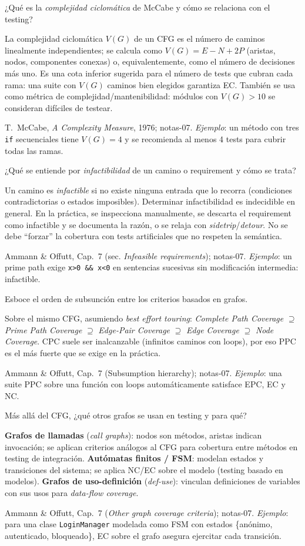 \documentclass[11pt,a4paper]{article}
\newcounter{preg}
\newcommand{\qa}[3]{%
  \stepcounter{preg}%
  \vspace{0.4em}
  \begin{preguntabox}{\thepreg}
  #1
  \end{preguntabox}
  \begin{respuestabox}
  #2
  \end{respuestabox}
  \begin{refbox}
  #3
  \end{refbox}
  \vspace{0.6em}
}
\begin{document}
\qa{¿Qué es la \emph{complejidad ciclomática} de McCabe y cómo se relaciona con el testing?}
{La complejidad ciclomática $V(G)$ de un CFG es el número de caminos linealmente independientes; se calcula como $V(G) = E - N + 2P$ (aristas, nodos, componentes conexas) o, equivalentemente, como el número de decisiones más uno. Es una cota inferior sugerida para el número de tests que cubran cada rama: una suite con $V(G)$ caminos bien elegidos garantiza EC. También se usa como métrica de complejidad/mantenibilidad: módulos con $V(G)>10$ se consideran difíciles de testear.}
{T.~McCabe, \emph{A Complexity Measure}, 1976; notas-07. \emph{Ejemplo}: un método con tres \texttt{if} secuenciales tiene $V(G)=4$ y se recomienda al menos 4 tests para cubrir todas las ramas.}

\qa{¿Qué se entiende por \emph{infactibilidad} de un camino o requirement y cómo se trata?}
{Un camino es \emph{infactible} si no existe ninguna entrada que lo recorra (condiciones contradictorias o estados imposibles). Determinar infactibilidad es indecidible en general. En la práctica, se inspecciona manualmente, se descarta el requirement como infactible y se documenta la razón, o se relaja con \emph{sidetrip}/\emph{detour}. No se debe ``forzar'' la cobertura con tests artificiales que no respeten la semántica.}
{Ammann \& Offutt, Cap.~7 (sec. \emph{Infeasible requirements}); notas-07. \emph{Ejemplo}: un prime path exige \texttt{x>0 \&\& x<0} en sentencias sucesivas sin modificación intermedia: infactible.}

\qa{Esboce el orden de subsunción entre los criterios basados en grafos.}
{Sobre el mismo CFG, asumiendo \emph{best effort touring}: \emph{Complete Path Coverage} $\supseteq$ \emph{Prime Path Coverage} $\supseteq$ \emph{Edge-Pair Coverage} $\supseteq$ \emph{Edge Coverage} $\supseteq$ \emph{Node Coverage}. CPC suele ser inalcanzable (infinitos caminos con loops), por eso PPC es el más fuerte que se exige en la práctica.}
{Ammann \& Offutt, Cap.~7 (Subsumption hierarchy); notas-07. \emph{Ejemplo}: una suite PPC sobre una función con loops automáticamente satisface EPC, EC y NC.}

\qa{Más allá del CFG, ¿qué otros grafos se usan en testing y para qué?}
{\textbf{Grafos de llamadas} (\emph{call graphs}): nodos son métodos, aristas indican invocación; se aplican criterios análogos al CFG para cobertura entre métodos en testing de integración. \textbf{Autómatas finitos / FSM}: modelan estados y transiciones del sistema; se aplica NC/EC sobre el modelo (testing basado en modelos). \textbf{Grafos de uso-definición} (\emph{def-use}): vinculan definiciones de variables con sus usos para \emph{data-flow coverage}.}
{Ammann \& Offutt, Cap.~7 (\emph{Other graph coverage criteria}); notas-07. \emph{Ejemplo}: para una clase \texttt{LoginManager} modelada como FSM con estados \{anónimo, autenticado, bloqueado\}, EC sobre el grafo asegura ejercitar cada transición.}
\end{document}
